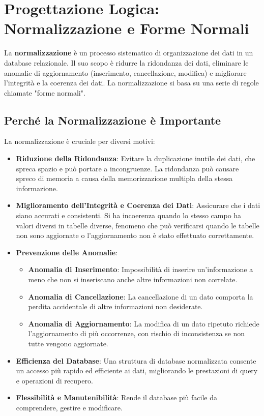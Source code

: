 \section{Progettazione Logica: Normalizzazione e Forme Normali}
La \textbf{normalizzazione} è un processo sistematico di organizzazione dei dati in un database relazionale. Il suo scopo è ridurre la ridondanza dei dati, eliminare le anomalie di aggiornamento (inserimento, cancellazione, modifica) e migliorare l'integrità e la coerenza dei dati. La normalizzazione si basa su una serie di regole chiamate "forme normali".

\subsection{Perché la Normalizzazione è Importante}
La normalizzazione è cruciale per diversi motivi:
\begin{itemize}
    \item \textbf{Riduzione della Ridondanza}: Evitare la duplicazione inutile dei dati, che spreca spazio e può portare a incongruenze. La ridondanza può causare spreco di memoria a causa della memorizzazione multipla della stessa informazione.
    \item \textbf{Miglioramento dell'Integrità e Coerenza dei Dati}: Assicurare che i dati siano accurati e consistenti. Si ha incoerenza quando lo stesso campo ha valori diversi in tabelle diverse, fenomeno che può verificarsi quando le tabelle non sono aggiornate o l'aggiornamento non è stato effettuato correttamente.
    \item \textbf{Prevenzione delle Anomalie}:
    \begin{itemize}
        \item \textbf{Anomalia di Inserimento}: Impossibilità di inserire un'informazione a meno che non si inseriscano anche altre informazioni non correlate.
        \item \textbf{Anomalia di Cancellazione}: La cancellazione di un dato comporta la perdita accidentale di altre informazioni non desiderate.
        \item \textbf{Anomalia di Aggiornamento}: La modifica di un dato ripetuto richiede l'aggiornamento di più occorrenze, con rischio di inconsistenza se non tutte vengono aggiornate.
    \end{itemize}
    \item \textbf{Efficienza del Database}: Una struttura di database normalizzata consente un accesso più rapido ed efficiente ai dati, migliorando le prestazioni di query e operazioni di recupero.
    \item \textbf{Flessibilità e Manutenibilità}: Rende il database più facile da comprendere, gestire e modificare.
\end{itemize}

